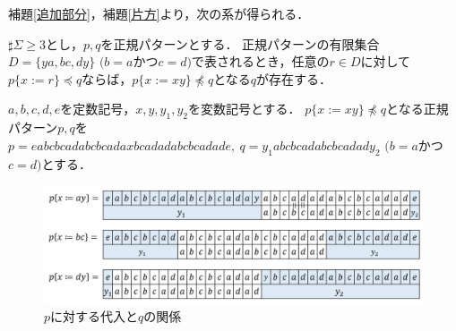 補題\ref{追加部分}，補題\ref{片方}より，次の系が得られる．

\begin{col}\label{両方}
$\sharp \Sigma \ge 3$とし，$p, q$を正規パターンとする．
正規パターンの有限集合$D= \{ ya, bc, dy \}$ $(b = a$かつ$c = d)$で表されるとき，任意の$r \in D$に対して$p \{ x := r \} \preceq q$ならば，$p \{ x := xy \} \not \preceq q$となる$q$が存在する．
\end{col}
\begin{ex}
$a,b,c,d,e$を定数記号，$x,y,y_{1},y_{2}$を変数記号とする．
$p \{ x:=xy \} \not \preceq q$となる正規パターン$p,q$を$p=eabcbcadabcbcadaxbcadadabcbcadade,~q=y_{1}abcbcadabcbcadady_{2}$ $(b = a$かつ$c = d)$とする．
\end{ex}

\begin{figure}
\includegraphics[width=\linewidth]{figs/Exam_b=a_c=d.png}
\vspace{-1cm}
\caption{$p$に対する代入と$q$の関係}
\label{b=aとc=dの例}
\end{figure}

